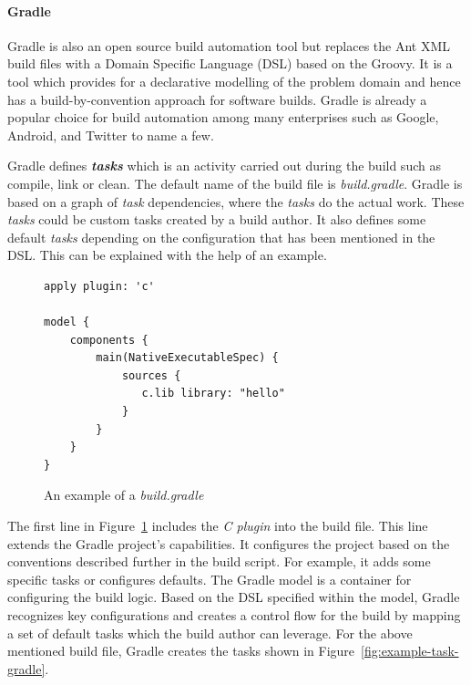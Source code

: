 \documentclass[12pt, a4paper, titlepage]{scrartcl}
\newcommand{\courierword}[1]{\textsf{\itshape #1}}{\fontfamily{pcr}\selectfont}%
\begin{document}
\paragraph{Gradle}
Gradle\cite{dockter2015gradle} is also an open source build automation tool but replaces the Ant XML build files with a Domain Specific Language (DSL)\cite{van2002domain} based on the Groovy\cite{koenig2007groovy}. It is a tool which provides for a declarative modelling of the problem domain and hence has a build-by-convention approach for software builds. Gradle is already a popular choice for build automation among many enterprises such as Google, Android, and Twitter to name a few\cite{gradleCompanies}. 
\par Gradle defines \textit{\textbf{tasks}} which is an activity carried out during the build such as compile, link or clean. The default name of the build file is \courierword{build.gradle}. Gradle is based on a graph of \textit{task} dependencies, where the \textit{tasks} do the actual work. These \textit{tasks} could be custom tasks created by a build author. It also defines some default \textit{tasks} depending on the configuration that has been mentioned in the DSL. This can be explained with the help of an example.

\begin{figure}[!ht]
\caption{An example of a \courierword{build.gradle}}
\label{fig:gradle-build-file-example}
\begin{lstlisting}[frame=single]
apply plugin: 'c'

model {
    components {
        main(NativeExecutableSpec) {
            sources {
               c.lib library: "hello"
            }
        }
    }
}
\end{lstlisting}
\end{figure}
\par The first line in Figure~\ref{fig:gradle-build-file-example} includes the \courierword{C plugin} into the build file. This line extends the Gradle project's capabilities. It configures the project based on the conventions described further in the build script. For example, it adds some specific tasks or configures defaults. The Gradle model is a container for configuring the build logic. Based on the DSL specified within the model, Gradle recognizes key configurations and creates a control flow for the build by mapping a set of default tasks which the build author can leverage. For the above mentioned build file, Gradle creates the tasks shown in Figure~\ref{fig:example-task-gradle}. 
\end{document}
